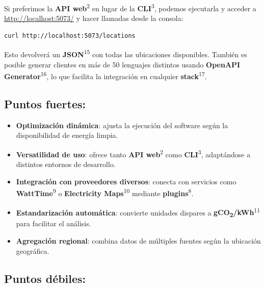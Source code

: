 \documentclass[12pt,a4paper]{report}
\begin{document}
Si preferimos la \textbf{API web}\textsuperscript{2} en lugar de la \textbf{CLI}\textsuperscript{3}, podemos ejecutarla y acceder a \href{http://localhost:5073}{http://localhost:5073/} y hacer llamadas desde la consola:

\begin{tcolorbox}[colback=codebackground, colframe=codeborder, boxrule=0.8pt, arc=0mm, boxsep=5pt, left=5pt, right=5pt, top=5pt, bottom=5pt]
\begin{lstlisting}[language=bash]
curl http://localhost:5073/locations
\end{lstlisting}
\end{tcolorbox}

Esto devolverá un \textbf{JSON}\textsuperscript{15} con todas las ubicaciones disponibles. También es posible generar clientes en más de 50 lenguajes distintos usando \textbf{OpenAPI Generator}\textsuperscript{16}, lo que facilita la integración en cualquier \textbf{stack}\textsuperscript{17}.

\subsection*{Puntos fuertes:}

\begin{itemize}
  \item \textbf{Optimización dinámica}: ajusta la ejecución del software según la disponibilidad de energía limpia.
  \item \textbf{Versatilidad de uso}: ofrece tanto \textbf{API web}\textsuperscript{2} como \textbf{CLI}\textsuperscript{3}, adaptándose a distintos entornos de desarrollo.
  \item \textbf{Integración con proveedores diversos}: conecta con servicios como \textbf{WattTime}\textsuperscript{9} o \textbf{Electricity Maps}\textsuperscript{10} mediante \textbf{plugins}\textsuperscript{8}.
  \item \textbf{Estandarización automática}: convierte unidades dispares a \textbf{gCO\textsubscript{2}/kWh}\textsuperscript{11} para facilitar el análisis.
  \item \textbf{Agregación regional}: combina datos de múltiples fuentes según la ubicación geográfica.
\end{itemize}

\subsection*{Puntos débiles:}
\end{document}
